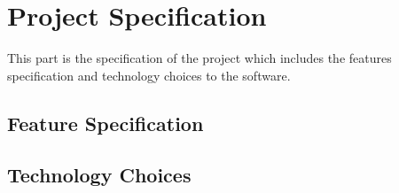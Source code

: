 \clearpage
\section{Project Specification}
This part is the specification of the project which includes the features specification and technology choices to the software. 

\subsection{Feature Specification}

\subsection{Technology Choices}